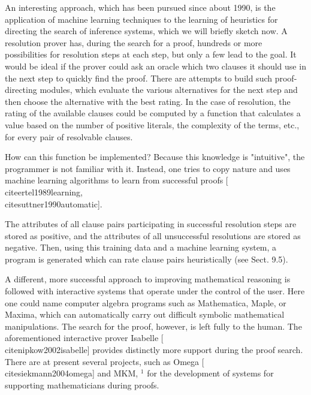\documentclass[10pt]{book}
\begin{document}
An interesting approach, which has been pursued since about 1990, is the application of machine learning techniques to the learning of heuristics for directing the search of inference systems, which we will briefly sketch now. A resolution prover has, during the search for a proof, hundreds or more possibilities for resolution steps at each step, but only a few lead to the goal. It would be ideal if the prover could ask an oracle which two clauses it should use in the next step to quickly find the proof. There are attempts to build such proof-directing modules, which evaluate the various alternatives for the next step and then choose the alternative with the best rating. In the case of resolution, the rating of the available clauses could be computed by a function that calculates a value based on the number of positive literals, the complexity of the terms, etc., for every pair of resolvable clauses.

How can this function be implemented? Because this knowledge is "intuitive", the programmer is not familiar with it. Instead, one tries to copy nature and uses machine learning algorithms to learn from successful proofs [\\cite{ertel1989learning}, \\cite{suttner1990automatic}].

The attributes of all clause pairs participating in successful resolution steps are stored as positive, and the attributes of all unsuccessful resolutions are stored as negative. Then, using this training data and a machine learning system, a program is generated which can rate clause pairs heuristically (see Sect. 9.5).

A different, more successful approach to improving mathematical reasoning is followed with interactive systems that operate under the control of the user. Here one could name computer algebra programs such as Mathematica, Maple, or Maxima, which can automatically carry out difficult symbolic mathematical manipulations. The search for the proof, however, is left fully to the human. The aforementioned interactive prover Isabelle [\\cite{nipkow2002isabelle}] provides distinctly more support during the proof search. There are at present several projects, such as Omega [\\cite{siekmann2004omega}] and MKM, ${ }^{1}$ for the development of systems for supporting mathematicians during proofs.
\end{document}
